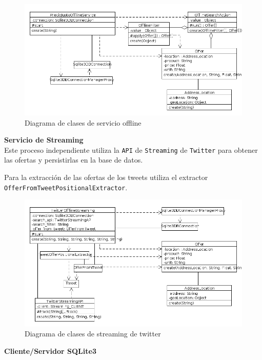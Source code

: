\begin{figure}[h]
\centerline{\includegraphics[width=0.6\paperwidth]{./imgs/class_diagram_offline_service.png}}
\caption{Diagrama de clases de servicio offline}
\label{fig:class_offline_service}
\end{figure}

\textbf{Servicio de Streaming}\\

Este proceso independiente utiliza la \texttt{API} de \texttt{Streaming} de \texttt{Twitter} para obtener las ofertas y persistirlas en la base de datos.

Para la extracci\'on de las ofertas de los tweets utiliza el extractor \texttt{OfferFromTweetPositionalExtractor}.

\begin{figure}[h]
\centerline{\includegraphics[width=0.4\paperwidth]{./imgs/class_diagram_offline_streaming.png}}
\caption{Diagrama de clases de streaming de twitter}
\label{fig:class_offline_streaming}
\end{figure}

\textbf{Cliente/Servidor SQLite3}\\

